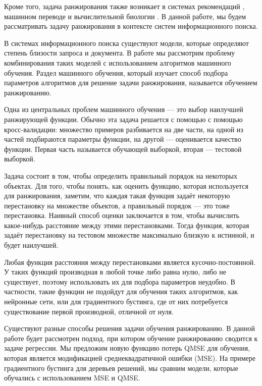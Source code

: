 \documentclass[specialist,
               substylefile = spbu.rtx,
               subf,href,colorlinks=true, 12pt]{disser}
\begin{document}
Кроме того, задача ранжирования также возникает в системах рекомендаций \cite{RecoUse}, машинном переводе \cite{TransUse} и вычислительной биологии \cite{TransUse}. В данной работе, мы будем рассматривать задачу ранжирования в контексте систем информационного поиска.\par

В системах информационного поиска существуют модели, которые определяют степень близости запроса и документа. В работе мы рассмотрим проблему комбинирования таких моделей с использованием алгоритмов машинного обучения. Раздел машинного обучения, который изучает способ подбора параметров алгоритмов для решение задачи ранжирования, называется обучением ранжированию\cite{IntL2R}.\par

Одна из центральных проблем машинного обучения --- это выбор наилучшей ранжирующей функции. Обычно эта задача решается с помощью с помощью кросс-валидации: множество примеров разбивается на две части, на одной из частей подбираются параметры функции, на другой --- оценивается качество функции. Первая часть называется обучающей выборкой, вторая --- тестовой выборкой.\par

Задача состоит в том, чтобы определить правильный порядок на некоторых объектах. Для того, чтобы понять, как оценить функцию, которая используется для ранжирования, заметим, что каждая такая функция задаёт некоторую перестановку на множестве объектов, а правильный порядок --- это тоже перестановка. Наивный способ оценки заключается в том, чтобы вычислить какое-нибудь расстояние между этими перестановками. Тогда функция, которая задаёт перестановку на тестовом множестве максимально близкую к истинной, и будет наилучшей.\par

Любая функция расстояния между перестановками является кусочно-постоянной. У таких функций производная в любой точке либо равна нулю, либо не существует, поэтому использовать их для подбора параметров неудобно. В частности, такие функции не подойдут для обучения таких алгоритмов, как нейронные сети, или для градиентного бустинга, где от них потребуется существование первой производной, отличной от нуля.\par 

Существуют разные способы решения задачи обучения ранжированию. В данной работе будет рассмотрен подход, при котором обучение ранжированию сводится к задаче регрессии. Мы предложим новую функцию потерь QMSE для обучения, которая является модификацией среднеквадратичной ошибки (MSE). На примере градиентного бустинга для деревьев решений, мы сравним модели, которые обучались с использованием MSE и QMSE.\par
\end{document}

